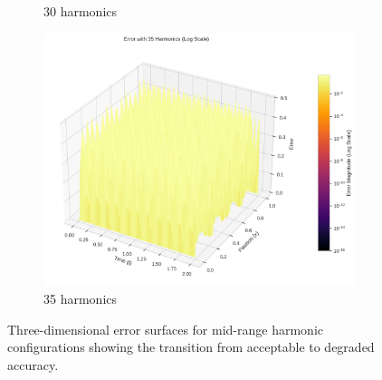 \begin{figure}[H]
\begin{subfigure}[b]{0.32\textwidth}
        \caption{30 harmonics}
    \end{subfigure}
    \hfill
    \begin{subfigure}[b]{0.32\textwidth}
        \centering
        \includegraphics[width=\textwidth]{figures/3d_comparison_error_35h.png}
        \caption{35 harmonics}
    \end{subfigure}
    \caption{Three-dimensional error surfaces for mid-range harmonic configurations showing the transition from acceptable to degraded accuracy.}
    \label{fig:3d_error_mid}
\end{figure}

